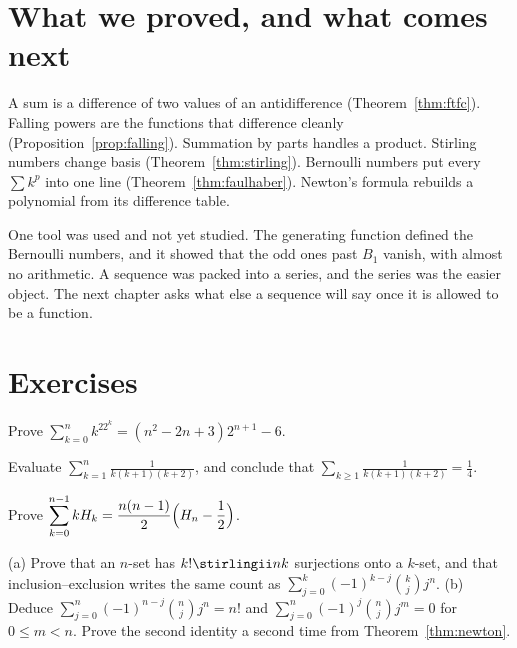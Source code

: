 \section{What we proved, and what comes next}

A sum is a difference of two values of an antidifference (Theorem~\ref{thm:ftfc}). Falling powers are the functions that difference cleanly (Proposition~\ref{prop:falling}). Summation by parts handles a product. Stirling numbers change basis (Theorem~\ref{thm:stirling}). Bernoulli numbers put every $\sum k^p$ into one line (Theorem~\ref{thm:faulhaber}). Newton's formula rebuilds a polynomial from its difference table.

One tool was used and not yet studied. The generating function defined the Bernoulli numbers, and it showed that the odd ones past $B_1$ vanish, with almost no arithmetic. A sequence was packed into a series, and the series was the easier object. The next chapter asks what else a sequence will say once it is allowed to be a function.

\section{Exercises}

\begin{exercise}[$\star$]\label{ex:k22k}
Prove $\displaystyle\sum_{k=0}^nk^22^k=(n^2-2n+3)2^{n+1}-6$.
\end{exercise}

\begin{exercise}[$\star$]\label{ex:triple}
Evaluate $\displaystyle\sum_{k=1}^n\frac1{k(k+1)(k+2)}$, and conclude that $\displaystyle\sum_{k\ge1}\frac1{k(k+1)(k+2)}=\frac14$.
\end{exercise}

\begin{exercise}[$\star\star$]\label{ex:kHk}
Prove $\displaystyle\sum_{k=0}^{n-1}kH_k=\frac{n(n-1)}2\Bigl(H_n-\frac12\Bigr)$.
\end{exercise}

\begin{exercise}[$\star$]\label{ex:surjections}
(a) Prove that an $n$-set has $k!\stirlingii nk$ surjections onto a $k$-set, and that inclusion--exclusion writes the same count as $\sum_{j=0}^k(-1)^{k-j}\binom kjj^n$.
(b) Deduce $\sum_{j=0}^n(-1)^{n-j}\binom njj^n=n!$ and $\sum_{j=0}^n(-1)^j\binom njj^m=0$ for $0\le m<n$. Prove the second identity a second time from Theorem~\ref{thm:newton}.
\end{exercise}

